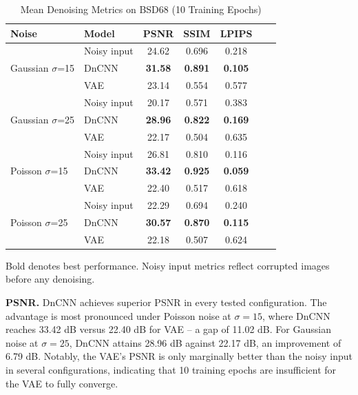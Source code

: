 \documentclass[conference]{IEEEtran}
\begin{document}
\begin{table}[!t]
  \caption{Mean Denoising Metrics on BSD68 (10 Training Epochs)}
  \label{tab:results}
  \centering
  \renewcommand{\arraystretch}{1.15}
  \begin{tabular}{llccccc}
    \toprule
    \textbf{Noise} & \textbf{Model} &
    \textbf{PSNR} & \textbf{SSIM} & \textbf{LPIPS} \\
    \midrule
    \multirow{3}{*}{Gaussian $\sigma$=15}
      & Noisy input  & 24.62 & 0.696 & 0.218 \\
      & DnCNN        & \textbf{31.58} & \textbf{0.891} & \textbf{0.105} \\
      & VAE          & 23.14 & 0.554 & 0.577 \\
    \midrule
    \multirow{3}{*}{Gaussian $\sigma$=25}
      & Noisy input  & 20.17 & 0.571 & 0.383 \\
      & DnCNN        & \textbf{28.96} & \textbf{0.822} & \textbf{0.169} \\
      & VAE          & 22.17 & 0.504 & 0.635 \\
    \midrule
    \multirow{3}{*}{Poisson $\sigma$=15}
      & Noisy input  & 26.81 & 0.810 & 0.116 \\
      & DnCNN        & \textbf{33.42} & \textbf{0.925} & \textbf{0.059} \\
      & VAE          & 22.40 & 0.517 & 0.618 \\
    \midrule
    \multirow{3}{*}{Poisson $\sigma$=25}
      & Noisy input  & 22.29 & 0.694 & 0.240 \\
      & DnCNN        & \textbf{30.57} & \textbf{0.870} & \textbf{0.115} \\
      & VAE          & 22.18 & 0.507 & 0.624 \\
    \bottomrule
  \end{tabular}
  \begin{tablenotes}
    \footnotesize
    \item Bold denotes best performance. Noisy input metrics reflect
    corrupted images before any denoising.
  \end{tablenotes}
\end{table}

\textbf{PSNR.} DnCNN achieves superior PSNR in every tested
configuration. The advantage is most pronounced under Poisson noise at
\(\sigma = 15\), where DnCNN reaches 33.42 dB versus 22.40 dB for VAE
-- a gap of 11.02 dB. For Gaussian noise at \(\sigma = 25\), DnCNN
attains 28.96 dB against 22.17 dB, an improvement of 6.79 dB. Notably,
the VAE's PSNR is only marginally better than the noisy input in several
configurations, indicating that 10 training epochs are insufficient for
the VAE to fully converge.
\end{document}
